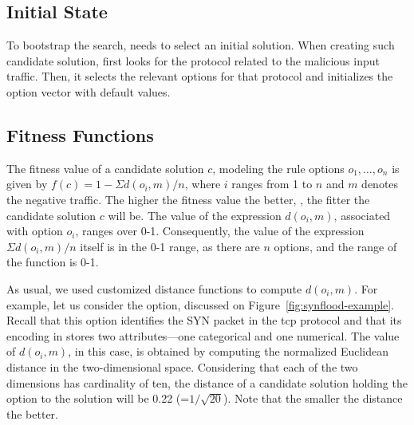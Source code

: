 \documentclass[runningheads]{llncs}
\begin{document}
\subsection{Initial State}

To bootstrap the search, \tname{} needs to select an initial
solution. When creating such candidate solution, \tname{} first looks
for the protocol related to the malicious input traffic. Then, it
selects the relevant options for that protocol and initializes the
option vector with default values. 


\subsection{Fitness Functions}

The fitness value of a candidate solution $c$, modeling the rule
options $o_1, \dots, o_n$ is given by $f(c)=1-\Sigma{d(o_i,m)}/n$,
where $i$ ranges from 1 to $n$ and $m$ denotes the negative
traffic. The higher the fitness value the better, \ie{}, the fitter
the candidate solution $c$ will be.  The value of the expression
$d(o_i,m)$, associated with option $o_i$, ranges over
0-1. Consequently, the value of the expression $\Sigma{d(o_i,m)}/n$
itself is in the 0-1 range, as there are $n$ options, and the range of
the function is 0-1.

As usual, we used customized distance functions to compute $d(o_i,
m)$. For example, let us consider the  option, discussed
on Figure~\ref{fig:synflood-example}. Recall that this option
identifies the SYN packet in the tcp protocol and that its encoding in
\tname{} stores two attributes---one categorical and one
numerical. The value of $d(o_i, m)$, in this case, is obtained by
computing the normalized Euclidean distance in the two-dimensional
space. Considering that each of the two dimensions has cardinality of
ten, the distance of a candidate solution holding the option
 to the solution will be 0.22
(=$1/\sqrt{20}$). Note that the smaller the distance the better.
\end{document}
